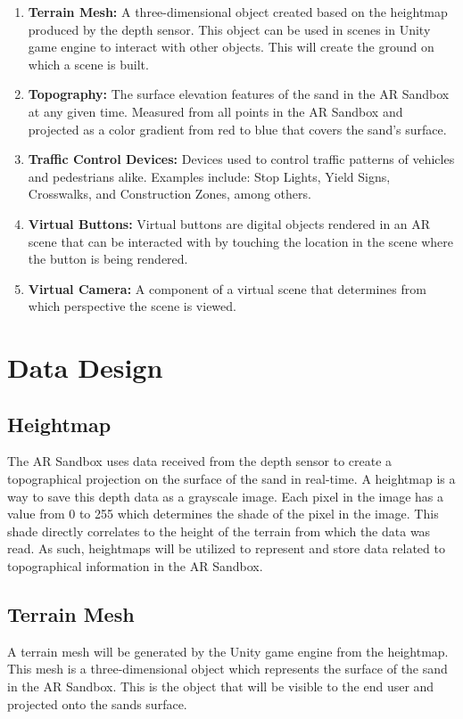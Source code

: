 \documentclass[letterpaper, 10pt, onecolumn, draftclsnofoot]{IEEEtran}
\begin{document}
\begin{enumerate}[label=]
        \item \textbf{Terrain Mesh:} A three-dimensional object created based on the heightmap produced by the depth sensor. This object can be used in scenes in Unity game engine to interact with other objects. This will create the ground on which a scene is built. 
        
        \item {\textbf{Topography:} The surface elevation features of the sand in the AR Sandbox at any given time. Measured from all points in the AR Sandbox and projected as a color gradient from red to blue that covers the sand's surface.}
        
        \item \textbf{Traffic Control Devices:} Devices used to control traffic patterns of vehicles and pedestrians alike. Examples include: Stop Lights, Yield Signs, Crosswalks, and Construction Zones, among others.
        
        \item {\textbf{Virtual Buttons:} Virtual buttons are digital objects rendered in an AR scene that can be interacted with by touching the location in the scene where the button is being rendered.} 
        
        \item \textbf{Virtual Camera:} A component of a virtual scene that determines from which perspective the scene is viewed.
        
    \end{enumerate}

\section{Data Design}
    \subsection{Heightmap}
        The AR Sandbox uses data received from the depth sensor to create a topographical projection on the surface of the sand in real-time. A heightmap is a way to save this depth data as a grayscale image. Each pixel in the image has a value from 0 to 255 which determines the shade of the pixel in the image. This shade directly correlates to the height of the terrain from which the data was read. As such, heightmaps will be utilized to represent and store data related to topographical information in the AR Sandbox.  
    \subsection{Terrain Mesh}
        A terrain mesh will be generated by the Unity game engine from the heightmap. This mesh is a three-dimensional object which represents the surface of the sand in the AR Sandbox. This is the object that will be visible to the end user and projected onto the sands surface.  
\end{document}
